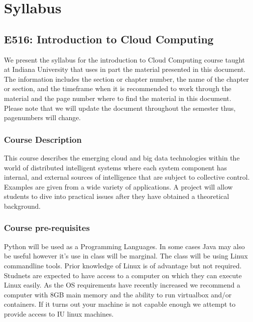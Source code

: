 \part{Syllabus}


\chapter{E516: Introduction to Cloud Computing}

We present the syllabus for the introduction to Cloud Computing course
taught at Indiana University that uses in part the material presented
in this document. The information includes the section or chapter
number, the name of the chapter or section, and the timeframe when it
is recommended to work through the material and the page number where
to find the material in this document. Please note that we will update
the document throughout the semester thus, pagenumbers will change. 

\section{Course Description}

This course describes the emerging cloud and big data technologies
within the world of distributed intelligent systems where each system
component has internal, and external sources of intelligence that are
subject to collective control. Examples are given from a wide variety
of applications. A project will allow students to dive into practical
issues after they have obtained a theoretical background.

\section{Course pre-requisites}

Python will be used as a Programming Languages. In some cases Java may
also be useful however it's use in class will be marginal. The class
will be using Linux commandline tools. Prior knowledge of Linux is of
advantage but not required.  Studnets are expected to have access to a
computer on which they can execute Linux easily. As the OS
requirements have recently increased we recommend a computer with 8GB
main memory and the ability to run virtualbox and/or containers. If it
turns out your machine is not capable enough we attempt to provide
access to IU linux machines.

